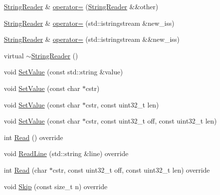 \begin{DoxyCompactItemize}
\item 
\mbox{\hyperlink{classlucene_1_1core_1_1analysis_1_1StringReader}{String\+Reader}} \& \mbox{\hyperlink{classlucene_1_1core_1_1analysis_1_1StringReader_a4ee9a9d9f36760e7d7a3495cb73efc70}{operator=}} (\mbox{\hyperlink{classlucene_1_1core_1_1analysis_1_1StringReader}{String\+Reader}} \&\&other)
\item 
\mbox{\hyperlink{classlucene_1_1core_1_1analysis_1_1StringReader}{String\+Reader}} \& \mbox{\hyperlink{classlucene_1_1core_1_1analysis_1_1StringReader_ae7440c5e8b7dd6f71a12986c55744e42}{operator=}} (std\+::istringstream \&new\+\_\+iss)
\item 
\mbox{\hyperlink{classlucene_1_1core_1_1analysis_1_1StringReader}{String\+Reader}} \& \mbox{\hyperlink{classlucene_1_1core_1_1analysis_1_1StringReader_a5278369c965094572c0b582fa87fe9ce}{operator=}} (std\+::istringstream \&\&new\+\_\+iss)
\item 
virtual \mbox{\hyperlink{classlucene_1_1core_1_1analysis_1_1StringReader_a9eb8a69da4acaa2c718b6dbc964552fb}{$\sim$\+String\+Reader}} ()
\item 
void \mbox{\hyperlink{classlucene_1_1core_1_1analysis_1_1StringReader_a2f707cdd271256c3cdf6e0004822612e}{Set\+Value}} (const std\+::string \&value)
\item 
void \mbox{\hyperlink{classlucene_1_1core_1_1analysis_1_1StringReader_aeecb85481cb6e99493a0792e685f2fea}{Set\+Value}} (const char $\ast$cstr)
\item 
void \mbox{\hyperlink{classlucene_1_1core_1_1analysis_1_1StringReader_ab28b0b0bfa46a28b55c0e4fe731cbaf8}{Set\+Value}} (const char $\ast$cstr, const uint32\+\_\+t len)
\item 
void \mbox{\hyperlink{classlucene_1_1core_1_1analysis_1_1StringReader_ac09c0dcf47934c6239845881b35c5aba}{Set\+Value}} (const char $\ast$cstr, const uint32\+\_\+t off, const uint32\+\_\+t len)
\item 
int \mbox{\hyperlink{classlucene_1_1core_1_1analysis_1_1StringReader_ac9c1bb033ee4f5862e47e90c422d3381}{Read}} () override
\item 
void \mbox{\hyperlink{classlucene_1_1core_1_1analysis_1_1StringReader_a5bf198e593389f1255ec7a4f69f3187d}{Read\+Line}} (std\+::string \&line) override
\item 
int \mbox{\hyperlink{classlucene_1_1core_1_1analysis_1_1StringReader_ab048d6d6d759175eeda5321a480995c3}{Read}} (char $\ast$cstr, const uint32\+\_\+t off, const uint32\+\_\+t len) override
\item 
void \mbox{\hyperlink{classlucene_1_1core_1_1analysis_1_1StringReader_a745fa855b7308d2c08e289751590cdc7}{Skip}} (const size\+\_\+t n) override

\end{DoxyCompactItemize}
